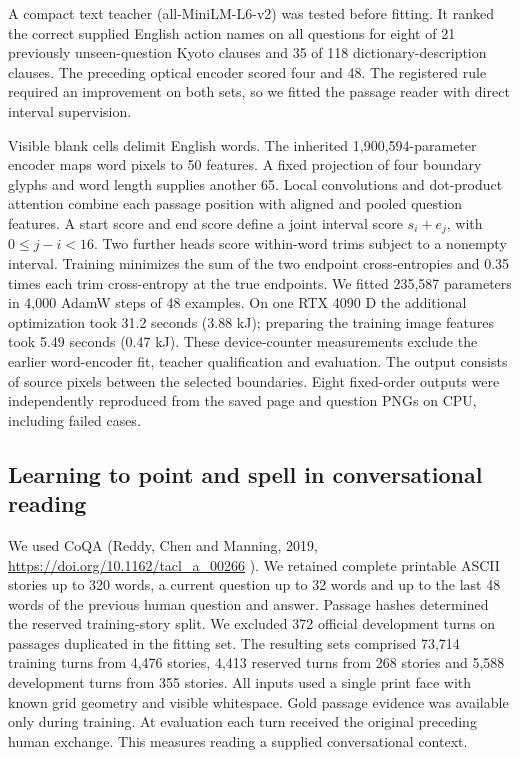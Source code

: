\documentclass[12pt,a4paper]{article}
\providecommand{\DIFadd}[1]{{\protect\color{blue} \sf #1}} %
\begin{document}
\DIFadd{A compact text teacher (all-MiniLM-L6-v2) was tested before fitting. It ranked the correct supplied English action names on all questions for eight of 21 previously unseen-question Kyoto clauses and 35 of 118 dictionary-description clauses. The preceding optical encoder scored four and 48. The registered rule required an improvement on both sets, so we fitted the passage reader with direct interval supervision.
}

\DIFadd{Visible blank cells delimit English words. The inherited 1,900,594-parameter encoder maps word pixels to 50 features. A fixed projection of four boundary glyphs and word length supplies another 65. Local convolutions and dot-product attention combine each passage position with aligned and pooled question features. A start score and end score define a joint interval score $s_i+e_j$, with $0\leq j-i<16$. Two further heads score within-word trims subject to a nonempty interval. Training minimizes the sum of the two endpoint cross-entropies and 0.35 times each trim cross-entropy at the true endpoints. We fitted 235,587 parameters in 4,000 AdamW steps of 48 examples. On one RTX 4090 D the additional optimization took 31.2 seconds (3.88 kJ); preparing the training image features took 5.49 seconds (0.47 kJ). These device-counter measurements exclude the earlier word-encoder fit, teacher qualification and evaluation. The output consists of source pixels between the selected boundaries. Eight fixed-order outputs were independently reproduced from the saved page and question PNGs on CPU, including failed cases.
}

\subsection*{\DIFadd{Learning to point and spell in conversational reading}}
\DIFadd{We used CoQA (Reddy, Chen and Manning, 2019, }\url{https://doi.org/10.1162/tacl_a_00266}\DIFadd{). We retained complete printable ASCII stories up to 320 words, a current question up to 32 words and up to the last 48 words of the previous human question and answer. Passage hashes determined the reserved training-story split. We excluded 372 official development turns on passages duplicated in the fitting set. The resulting sets comprised 73,714 training turns from 4,476 stories, 4,413 reserved turns from 268 stories and 5,588 development turns from 355 stories. All inputs used a single print face with known grid geometry and visible whitespace. Gold passage evidence was available only during training. At evaluation each turn received the original preceding human exchange. This measures reading a supplied conversational context.
}
\end{document}

